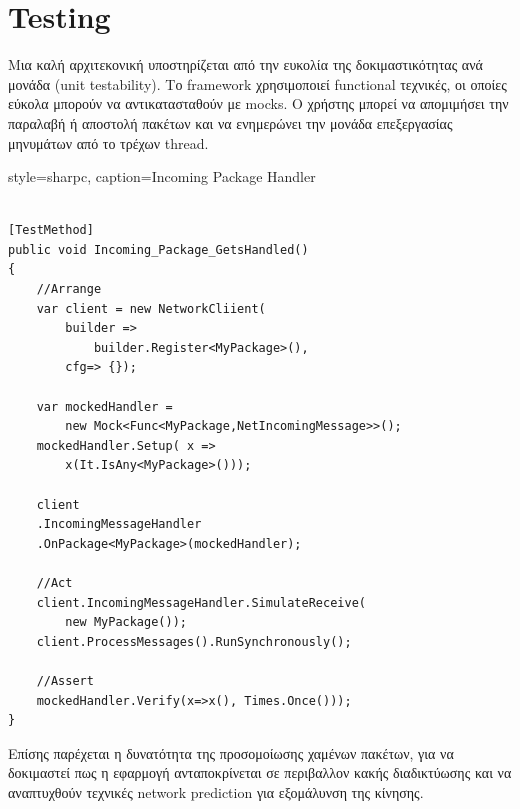 	\section{Testing}
	Μια καλή αρχιτεκονική υποστηρίζεται από την ευκολία της δοκιμαστικότητας ανά μονάδα (unit testability). Το framework χρησιμοποιεί functional τεχνικές, οι οποίες εύκολα μπορούν να αντικατασταθούν με mocks. Ο χρήστης μπορεί να απομιμήσει την παραλαβή ή αποστολή πακέτων και να ενημερώνει την μονάδα επεξεργασίας μηνυμάτων από το τρέχων thread.
	
	\lstset
	{
		style=sharpc, 
		caption={Incoming Package Handler}
	}
	\begin{lstlisting}
	
[TestMethod]
public void Incoming_Package_GetsHandled()
{
	//Arrange
	var client = new NetworkCliient(
		builder => 
			builder.Register<MyPackage>(),
		cfg=> {});
		
	var mockedHandler = 
		new Mock<Func<MyPackage,NetIncomingMessage>>();
	mockedHandler.Setup( x => 
		x(It.IsAny<MyPackage>()));
	
	client
	.IncomingMessageHandler
	.OnPackage<MyPackage>(mockedHandler);	
	
	//Act	
	client.IncomingMessageHandler.SimulateReceive(
		new MyPackage());	
	client.ProcessMessages().RunSynchronously();
	
	//Assert
	mockedHandler.Verify(x=>x(), Times.Once()));
}
	\end{lstlisting}
		
	Επίσης παρέχεται η δυνατότητα της προσομοίωσης χαμένων πακέτων, για να δοκιμαστεί πως η εφαρμογή ανταποκρίνεται σε περιβαλλον κακής διαδικτύωσης και να αναπτυχθούν τεχνικές network prediction για εξομάλυνση της κίνησης.
	